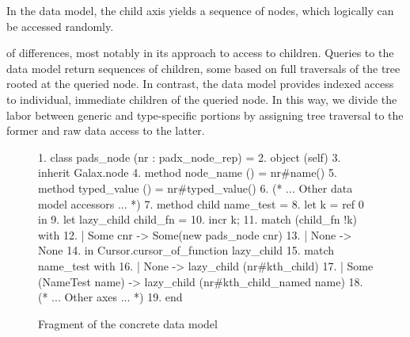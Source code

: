In the \Galax{} data model, the child axis yields a
sequence of nodes, which logically can be accessed randomly.  

 of differences, most notably in its approach
to access to children.  Queries to the \galax data model return
sequences of children, some based on full traversals of the tree
rooted at the queried node. In contrast, the \padx{} data model
provides indexed access to individual, immediate children of the
queried node. In this way, we divide the labor between generic and
type-specific portions by assigning tree traversal to the former and
raw data access to the latter.

\begin{figure*}
\begin{small}
\begin{code}
{ 1}. class pads\_node (nr : padx\_node\_rep) =  
{ 2}. object (self)
{ 3}.   inherit Galax.node
{ 4}.   method node\_name   () = nr#name()
{ 5}.   method typed\_value () = nr#typed_value() 
{ 6}.   (* ... Other data model accessors ... *)
\mbox{}
{ 7}.   method child name\_test =  
{ 8}.     let k = ref 0 in
{ 9}.     let lazy\_child child\_fn = 
{10}.      incr k;
{11}.       match (child\_fn !k) with
{12}.       | Some cnr ->  Some(new pads\_node cnr)
{13}.       | None -> None
{14}.       in Cursor.cursor\_of\_function lazy\_child
{15}.     match name\_test with 
{16}.     | None ->  lazy\_child (nr#kth\_child)
{17}.     | Some (NameTest name) -> lazy\_child (nr#kth\_child\_named name)
\mbox{}
{18}.   (* ... Other axes ... *)
{19}. end
\end{code}
\end{small}
\caption{Fragment of the \padx{} concrete data model}
\label{fig:padx-element-node}
\end{figure*}



